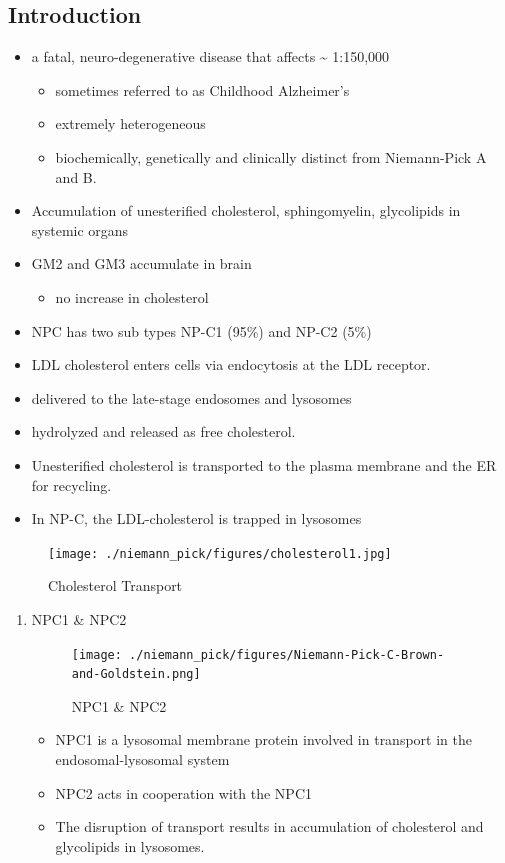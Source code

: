 \documentclass{scrartcl}
\begin{document}
\subsection{Introduction}
\label{sec:org387a441}
\begin{itemize}
\item a fatal, neuro-degenerative disease that affects \textasciitilde{} 1:150,000
\begin{itemize}
\item sometimes referred to as Childhood Alzheimer’s
\item extremely heterogeneous
\item biochemically, genetically and clinically distinct from Niemann-Pick A and B.
\end{itemize}
\item Accumulation of unesterified cholesterol, sphingomyelin, glycolipids in systemic organs
\item GM2 and GM3 accumulate in brain
\begin{itemize}
\item no increase in cholesterol
\end{itemize}
\item NPC has two sub types NP-C1 (95\%) and NP-C2 (5\%)

\item LDL cholesterol enters cells via endocytosis at the LDL receptor.
\item delivered to the late-stage endosomes and lysosomes
\item hydrolyzed and released as free cholesterol.
\item Unesterified cholesterol is transported to the plasma membrane and the ER for recycling.

\item In NP-C, the LDL-cholesterol is trapped in lysosomes
\end{itemize}

\begin{figure}[htbp]
\centering
\texttt{[image: ./niemann\_pick/figures/cholesterol1.jpg]}
\caption{\label{fig:orge615a83}
Cholesterol Transport}
\end{figure}

\begin{enumerate}
\item NPC1 \& NPC2
\label{sec:org8559317}

\begin{figure}[htbp]
\centering
\texttt{[image: ./niemann\_pick/figures/Niemann-Pick-C-Brown-and-Goldstein.png]}
\caption{\label{fig:orgfd23099}
NPC1 \& NPC2}
\end{figure}

\begin{itemize}
\item NPC1 is a lysosomal membrane protein involved in transport in the endosomal-lysosomal system
\item NPC2 acts in cooperation with the NPC1
\item The disruption of transport results in accumulation of cholesterol and glycolipids in lysosomes.
\end{itemize}
\end{enumerate}
\end{document}
